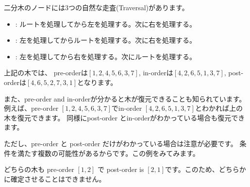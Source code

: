 二分木のノードには3つの自然な走査(Traversal)があります。
\begin{itemize}
\item {}: ルートを処理してから左を処理する。次に右を処理する。
\item {}: 左を処理してからルートを処理する。次に右を処理する。
\item {}: 左を処理してから右を処理する。次にルートを処理する。
\end{itemize}

上記の木では、
pre-orderは$[1,2,4,5,6,3,7]$,
in-orderは$[4,2,6,5,1,3,7]$,
post-orderは$[4,6,5,2,7,3,1]$となります。

また、pre-order and in-orderが分かると木が復元できることも知られています。
例えば、pre-order $[1,2,4,5,6,3,7]$でin-order $[4,2,6,5,1,3,7]$とわかれば上の木を復元できます。
同様にpost-order とin-orderがわかっている場合も復元できます。

ただし、pre-order と post-order だけがわかっている場合は注意が必要です。
条件を満たす複数の可能性があるからです。この例をみてみます。
\begin{center}
\end{center}
どちらの木も pre-order $[1,2]$ で post-order is $[2,1]$です。このため、どちらかに確定させることはできません。
